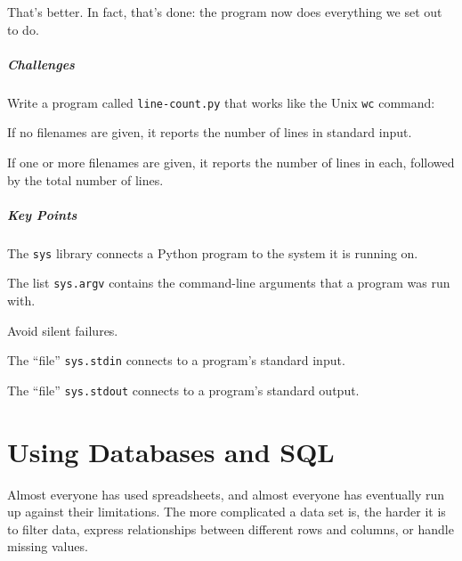 \documentclass{book}
\begin{document}
That's better. In fact, that's done: the program now does everything we
set out to do.

\mbox{}\paragraph{Challenges}

\begin{swcenumerate}
\item
  Write a program called \texttt{line-count.py} that works like the Unix
  \texttt{wc} command:

  \begin{swcitemize2}
  \item
    If no filenames are given, it reports the number of lines in
    standard input.
  \item
    If one or more filenames are given, it reports the number of lines
    in each, followed by the total number of lines.
   \end{swcitemize2}
\end{swcenumerate}

\mbox{}\paragraph{Key Points}

\begin{swcitemize}
\item
  The \texttt{sys} library connects a Python program to the system it is
  running on.
\item
  The list \texttt{sys.argv} contains the command-line arguments that a
  program was run with.
\item
  Avoid silent failures.
\item
  The ``file'' \texttt{sys.stdin} connects to a program's standard
  input.
\item
  The ``file'' \texttt{sys.stdout} connects to a program's standard
  output.
\end{swcitemize}

\chapter{Using Databases and SQL}\label{s:sql}

Almost everyone has used spreadsheets, and almost everyone has
eventually run up against their limitations. The more complicated a data
set is, the harder it is to filter data, express relationships between
different rows and columns, or handle missing values.
\end{document}
